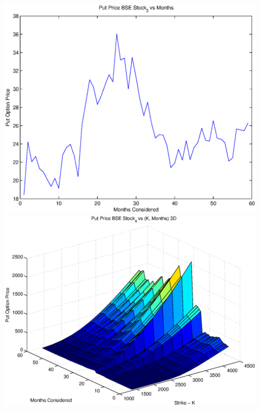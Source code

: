 \documentclass{article}
\begin{document}
\includegraphics[width=\textwidth]{Put_Price_BSE_Stock_3_vs_Months} \\

\includegraphics[width=\textwidth]{Put_Price_BSE_Stock_4_vs_(K,_Months)_3D} \\
\end{document}
